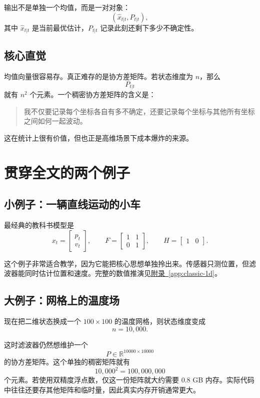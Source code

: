 \documentclass[12pt,a4paper]{ctexart}
\begin{document}
输出不是单独一个均值，而是一对对象：
\[
(\hat{x}_{t|t}, P_{t|t}),
\]
其中 \(\hat{x}_{t|t}\) 是当前最优估计，\(P_{t|t}\) 记录此刻还剩下多少不确定性。

\subsection{核心直觉}

均值向量很容易存。真正难存的是协方差矩阵。若状态维度为 \(n\)，那么
\[
P_{t|t}
\]
就有 \(n^2\) 个元素。一个稠密协方差矩阵的含义是：
\begin{quote}
我不仅要记录每个坐标各自有多不确定，还要记录每个坐标与其他所有坐标之间如何一起波动。
\end{quote}

这在统计上很有价值，但也正是高维场景下成本爆炸的来源。

\section{贯穿全文的两个例子}

\subsection{小例子：一辆直线运动的小车}

最经典的教科书模型是
\[
x_t =
\begin{bmatrix}
p_t\\
v_t
\end{bmatrix},
\qquad
F =
\begin{bmatrix}
1 & 1\\
0 & 1
\end{bmatrix},
\qquad
H =
\begin{bmatrix}
1 & 0
\end{bmatrix}.
\]

这个例子非常适合教学，因为它能把核心思想单独拎出来。传感器只测位置，但滤波器能同时估计位置和速度。完整的数值推演见\hyperref[app:classic-1d]{附录~\ref*{app:classic-1d}}。

\subsection{大例子：网格上的温度场}

现在把二维状态换成一个 \(100 \times 100\) 的温度网格，则状态维度变成
\[
n = 10{,}000.
\]

这时滤波器仍然想维护一个
\[
P \in \mathbb{R}^{10000 \times 10000}
\]
的协方差矩阵。这个单独的稠密矩阵就有
\[
10{,}000^2 = 100{,}000{,}000
\]
个元素。若使用双精度浮点数，仅这一份矩阵就大约需要 \(0.8\) GB 内存。实际代码中往往还要存其他矩阵和临时量，因此真实内存开销通常更大。
\end{document}
